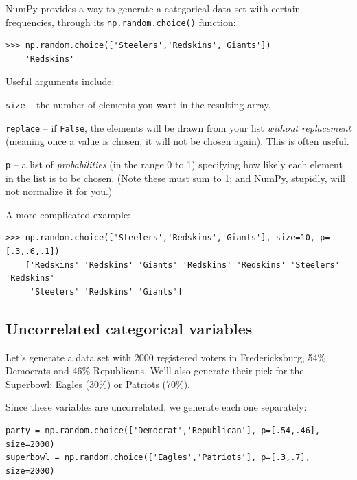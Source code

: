 NumPy provides a way to generate a categorical data set with certain
frequencies, through its \texttt{np.random.choice()} function:

\begin{Verbatim}[fontsize=\small,samepage=true,frame=single]
>>> np.random.choice(['Steelers','Redskins','Giants'])
    'Redskins'
\end{Verbatim}

Useful arguments include:

\begin{compactitem}
\item \texttt{size} -- the number of elements you want in the resulting array.
\item \texttt{replace} -- if \texttt{False}, the elements will be drawn from
your list \textit{without replacement} (meaning once a value is chosen, it
will not be chosen again). This is often useful.
\item \texttt{p} -- a list of \textit{probabilities} (in the range 0 to 1)
specifying how likely each element in the list is to be chosen. (Note these
must sum to 1; and NumPy, stupidly, will not normalize it for you.)
\end{compactitem}

A more complicated example:
\begin{Verbatim}[fontsize=\footnotesize,samepage=true,frame=single]
>>> np.random.choice(['Steelers','Redskins','Giants'], size=10, p=[.3,.6,.1])
    ['Redskins' 'Redskins' 'Giants' 'Redskins' 'Redskins' 'Steelers' 'Redskins'
     'Steelers' 'Redskins' 'Giants']
\end{Verbatim}


\subsection{Uncorrelated categorical variables}

Let's generate a data set with 2000 registered voters in Fredericksburg, 54\%
Democrats and 46\% Republicans. We'll also generate their pick for the
Superbowl: Eagles (30\%) or Patriots (70\%).

Since these variables are uncorrelated, we generate each one separately:

\begin{Verbatim}[fontsize=\footnotesize,samepage=true]
party = np.random.choice(['Democrat','Republican'], p=[.54,.46], size=2000)
superbowl = np.random.choice(['Eagles','Patriots'], p=[.3,.7], size=2000)
\end{Verbatim}

